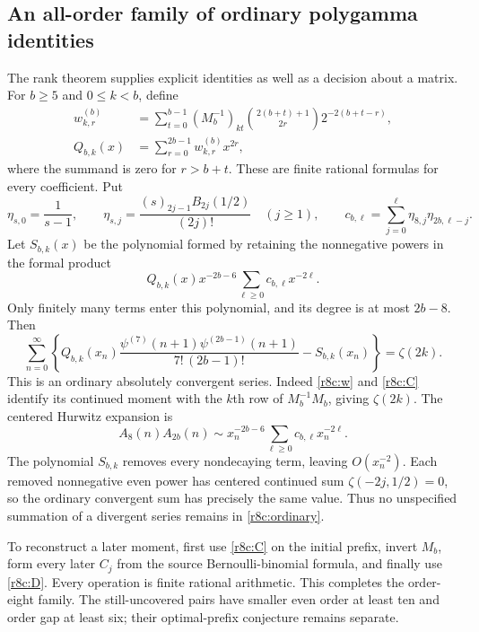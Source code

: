 \documentclass[11pt,a4paper]{article}
\numberwithin{equation}{section}
\theoremstyle{plain}
\theoremstyle{definition}
\theoremstyle{remark}
\begin{document}
\subsection{An all-order family of ordinary polygamma identities}

The rank theorem supplies explicit identities as well as a decision
about a matrix. For $b\ge5$ and $0\le k<b$, define
\begin{align}
 w_{k,r}^{(b)}&=
 \sum_{t=0}^{b-1}(M_b^{-1})_{kt}
 \binom{2(b+t)+1}{2r}2^{-2(b+t-r)},
 \label{r8c:w}\\
 Q_{b,k}(x)&=\sum_{r=0}^{2b-1}w_{k,r}^{(b)}x^{2r},
 \label{r8c:Q}
\end{align}
where the summand is zero for $r>b+t$. These are finite rational
formulas for every coefficient. Put
\[
 \eta_{s,0}=\frac1{s-1},\qquad
 \eta_{s,j}=\frac{(s)_{2j-1}B_{2j}(1/2)}{(2j)!}\quad(j\ge1),
 \qquad
 c_{b,\ell}=\sum_{j=0}^{\ell}\eta_{8,j}\eta_{2b,\ell-j}.
\]
Let $S_{b,k}(x)$ be the polynomial formed by retaining the
nonnegative powers in the formal product
\[
 Q_{b,k}(x)x^{-2b-6}\sum_{\ell\ge0}c_{b,\ell}x^{-2\ell}.
\]
Only finitely many terms enter this polynomial, and its degree is
at most $2b-8$. Then
\begin{equation}\label{r8c:ordinary}
 \boxed{\sum_{n=0}^{\infty}
 \left\{Q_{b,k}(x_n)
 \frac{\psi^{(7)}(n+1)\psi^{(2b-1)}(n+1)}{7!\,(2b-1)!}
       -S_{b,k}(x_n)\right\}=\zeta(2k).}
\end{equation}
This is an ordinary absolutely convergent series. Indeed
\eqref{r8c:w} and \eqref{r8c:C} identify its continued moment
with the $k$th row of $M_b^{-1}M_b$, giving $\zeta(2k)$.
The centered Hurwitz expansion is
\[
 A_8(n)A_{2b}(n)\sim x_n^{-2b-6}
                      \sum_{\ell\ge0}c_{b,\ell}x_n^{-2\ell}.
\]
The polynomial $S_{b,k}$ removes every nondecaying term, leaving
$O(x_n^{-2})$. Each removed nonnegative even power has centered
continued sum $\zeta(-2j,1/2)=0$, so the ordinary convergent sum
has precisely the same value. Thus no unspecified summation of a
divergent series remains in \eqref{r8c:ordinary}.

To reconstruct a later moment, first use \eqref{r8c:C} on the
initial prefix, invert $M_b$, form every later $C_j$ from the
source Bernoulli-binomial formula, and finally use \eqref{r8c:D}.
Every operation is finite rational arithmetic. This completes the
order-eight family. The still-uncovered pairs have smaller even order
at least ten and order gap at least six; their optimal-prefix
conjecture remains separate.
\end{document}

